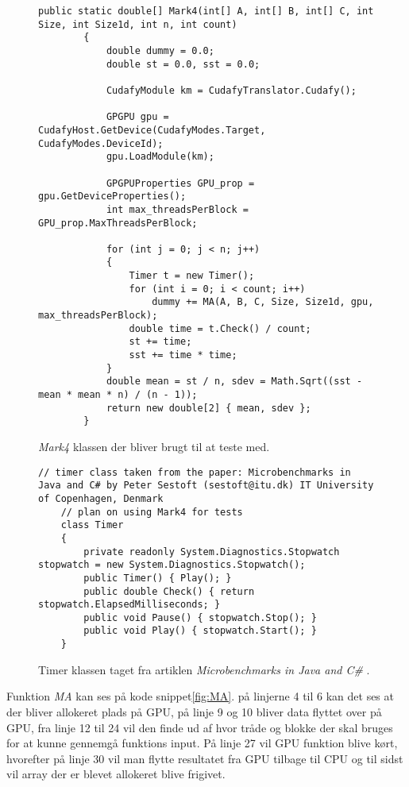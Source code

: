 \begin{figure}[!ht]
    \centering
    \lstset{style=sharpc}
	\begin{lstlisting}
public static double[] Mark4(int[] A, int[] B, int[] C, int Size, int Size1d, int n, int count)
        {
            double dummy = 0.0;
            double st = 0.0, sst = 0.0;

            CudafyModule km = CudafyTranslator.Cudafy();

            GPGPU gpu = CudafyHost.GetDevice(CudafyModes.Target, CudafyModes.DeviceId);
            gpu.LoadModule(km);

            GPGPUProperties GPU_prop = gpu.GetDeviceProperties();
            int max_threadsPerBlock = GPU_prop.MaxThreadsPerBlock;

            for (int j = 0; j < n; j++)
            {
                Timer t = new Timer();
                for (int i = 0; i < count; i++)
                    dummy += MA(A, B, C, Size, Size1d, gpu, max_threadsPerBlock);
                double time = t.Check() / count;
                st += time;
                sst += time * time;
            }
            double mean = st / n, sdev = Math.Sqrt((sst - mean * mean * n) / (n - 1));
            return new double[2] { mean, sdev };
        }
	\end{lstlisting}
    \caption{\textit{Mark4} klassen der bliver brugt til at teste med.}
    \label{fig:Mark4}
\end{figure}

\begin{figure}[!ht]
    \centering
    \lstset{style=sharpc}
	\begin{lstlisting}
// timer class taken from the paper: Microbenchmarks in Java and C# by Peter Sestoft (sestoft@itu.dk) IT University of Copenhagen, Denmark
    // plan on using Mark4 for tests
    class Timer
    {
        private readonly System.Diagnostics.Stopwatch stopwatch = new System.Diagnostics.Stopwatch();
        public Timer() { Play(); }
        public double Check() { return stopwatch.ElapsedMilliseconds; }
        public void Pause() { stopwatch.Stop(); }
        public void Play() { stopwatch.Start(); }
    }
	\end{lstlisting}
    \caption{Timer klassen taget fra artiklen \textit{Microbenchmarks in Java and C\#} \cite{Microbenchmarks}.}
    \label{fig:timer}
\end{figure}

Funktion \textit{MA} kan ses på kode snippet\ref{fig:MA}. på linjerne 4 til 6 kan det ses at der bliver allokeret plads på GPU, på linje 9 og 10 bliver data flyttet over på GPU, fra linje 12 til 24 vil den finde ud af hvor tråde og blokke der skal bruges for at kunne gennemgå funktions input. På linje 27 vil GPU funktion blive kørt, hvorefter på linje 30 vil man flytte resultatet fra GPU tilbage til CPU og til sidst vil array der er blevet allokeret blive frigivet.

